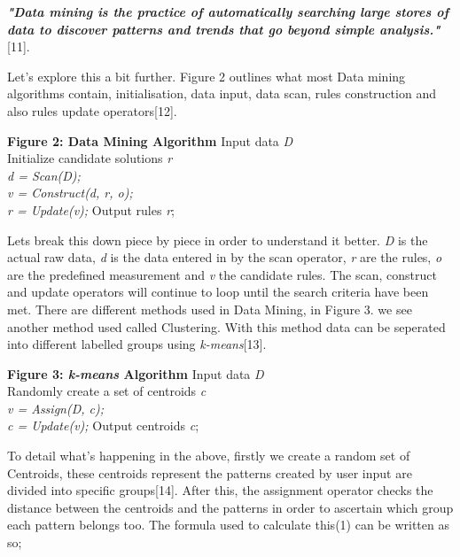 \documentclass[10pt,journal,compsoc]{IEEEtran}
\begin{document}
\textbf{\textit{"Data mining is the practice of automatically searching large stores of data to discover patterns and trends that go beyond simple analysis."}}[11]. 

Let's explore this a bit further. Figure 2 outlines what most Data mining algorithms contain, initialisation, data input, data scan, rules construction and also rules update operators[12].\\



\begin{algoBox}{\textbf{Figure 2: Data Mining Algorithm}}
	{Input data \textit{D}}\\
	{Initialize candidate solutions \textit{r}}\\
	{
		\textit{d = Scan(D);\\
			v = Construct(d, r, o);\\
			r = Update(v);}
	}
	Output rules \textit{r};
\end{algoBox}

Lets break this down piece by piece in order to understand it better. \textit{D} is the actual raw data, \textit{d} is the data entered in by the scan operator, \textit{r} are the rules, \textit{o} are the predefined measurement and \textit{v} the candidate rules. The scan, construct and update operators will continue to loop until the search criteria have been met.
There are different methods used in Data Mining, in Figure 3\textsl{}. we see another method used called Clustering. With this method data can be seperated into different labelled groups using \textit{k-means}[13].\\


\begin{algoBox}{\textbf{Figure 3: \textit{k-means} Algorithm}}
	{Input data \textit{D}}\\
	{Randomly create a set of centroids \textit{c}}\\
	{
		\textit{v = Assign(D, c);\\
			c = Update(v);}
	}
	Output centroids \textit{c};
\end{algoBox}

To detail what's happening in the above, firstly we create a random set of Centroids, these centroids represent the patterns created by user input are divided into specific groups[14]. After this, the assignment operator checks the distance between the centroids and the patterns in order to ascertain which group each pattern belongs too. The formula used to calculate this(1) can be written as so;
\end{document}
